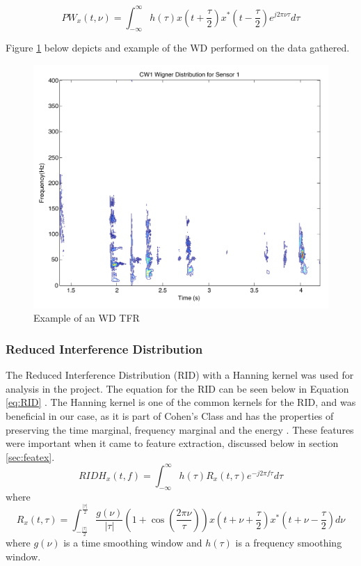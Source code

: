 \documentclass{article}[11pt]
\newcommand{\bp}[1] {\left( #1 \right)}
\newcommand{\infint}{\int_{-\infty}^\infty}
\begin{document}
\begin{equation}
\label{eq:PWD}
PW_x(t, \nu) = \infint h(\tau)x\bp{t+\frac{\tau}{2}}x^*\bp{t-\frac{\tau}{2}}e^{j2\pi\nu\tau} d\tau
\end{equation}

Figure \ref{fig:WDTFR} below depicts and example of the WD performed on the data gathered.

\begin{figure}[H]
\centering
\includegraphics[scale = 0.6]{Images/WD.pdf}
\caption{Example of an WD TFR}
\label{fig:WDTFR}
\end{figure}

\subsubsection{Reduced Interference Distribution}
\label{sec:RID}
The Reduced Interference Distribution (RID) with a Hanning kernel was used for analysis in the project. The equation for the RID can be seen below in Equation \eqref{eq:RID} \cite{Auger2005}. The Hanning kernel is one of the common kernels for the RID, and was beneficial in our case, as it is part of Cohen's Class and has the properties of preserving the time marginal, frequency marginal and the energy \cite{Jeong1992}. These features were important when it came to feature extraction, discussed below in section \ref{sec:featex}.
\begin{equation}
\label{eq:RID}
 RIDH_x(t, f) = \infint h(\tau)R_x(t, \tau) e^{-j2\pi f \tau} d\tau
\end{equation}
where
\begin{equation*}
R_x(t,\tau) = \int_{-\frac{|\tau|}{2}}^{\frac{|\tau|}{2}} \frac{g(\nu)}{|\tau|} \bp{1 + \cos\bp{\frac{2\pi\nu}{\tau}}} x\bp{t + \nu + \frac{\tau}{2}}x^*\bp{t + \nu - \frac{\tau}{2}} d\nu
\end{equation*}
where $g(\nu)$ is a time smoothing window and $h(\tau)$ is a frequency smoothing window.
\end{document}
